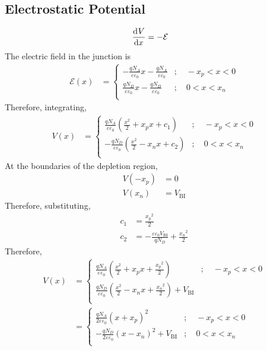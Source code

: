 \documentclass[titlepage, fleqn, a4paper, 12pt, twoside]{article}
\theoremstyle{definition}
\theoremstyle{theorem}
\begin{document}
\subsection{Electrostatic Potential}

\begin{align*}
	\dod{V}{x} &= -\mathcal{E}
\end{align*}
The electric field in the junction is
\begin{align*}
	\mathcal{E}(x) &=
		\begin{cases}
			-\frac{q N_A}{\varepsilon \varepsilon_0} x - \frac{q N_A}{\varepsilon \varepsilon_0} & ;\quad -x_p < x < 0 \\
			\frac{q N_D}{\varepsilon \varepsilon_0} x - \frac{q N_D}{\varepsilon \varepsilon_0}  & ;\quad 0 < x < x_n  \\
		\end{cases}
\end{align*}
Therefore, integrating,
\begin{align*}
	V(x) &=
		\begin{cases}
			\frac{q N_A}{\varepsilon \varepsilon_0} \left( \frac{x^2}{2} + x_p x + c_1 \right) &;\quad -x_p < x < 0\\
			-\frac{q N_D}{\varepsilon \varepsilon_0} \left( \frac{x^2}{2} - x_n x + c_2 \right) &;\quad 0 < x < x_n\\
		\end{cases}
\end{align*}
At the boundaries of the depletion region,
\begin{align*}
	V(-x_p) &= 0\\
	V(x_n) &= V_{\text{BI}}
\end{align*}
Therefore, substituting,
\begin{align*}
	c_1 &= \frac{{x_p}^2}{2}\\
	c_2 &= -\frac{\varepsilon \varepsilon_0 V_{\text{BI}}}{q N_D} + \frac{{x_n}^2}{2}
\end{align*}
Therefore,
\begin{align*}
	V(x) &=
		\begin{cases}
			\frac{q N_A}{\varepsilon \varepsilon_0} \left( \frac{x^2}{2} + x_p x + \frac{{x_p}^2}{2} \right) &;\quad -x_p < x < 0\\
			\frac{q N_D}{\varepsilon \varepsilon_0} \left( \frac{x^2}{2} - x_n x + \frac{{x_n}^2}{2} \right) + V_{\text{BI}}\\
		\end{cases}\\
	&=
		\begin{cases}
			\frac{q N_A}{2 \varepsilon \varepsilon_0} (x + x_p)^2 &;\quad -x_p < x < 0\\
			-\frac{q N_D}{2 \varepsilon \varepsilon_0} (x - x_n)^2 + V_{\text{BI}} &;\quad 0 < x < x_n\\
		\end{cases}
\end{align*}
\end{document}
